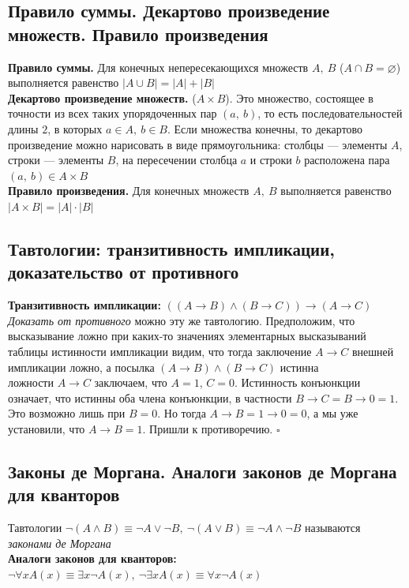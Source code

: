 \documentclass[a4paper]{article}
\newcommand{\qed}{\hfill$\square$}
\begin{document}
\subsection{Правило суммы. Декартово произведение множеств. Правило произведения}
\textbf{Правило суммы.} Для конечных непересекающихся множеств $A,\ B$ ($A\cap B=\varnothing$) выполняется равенство $|A\cup B|=|A|+|B|$\\[2mm]
\indent \textbf{Декартово произведение множеств.} ($A\times B$). Это множество, состоящее в точности из всех таких упорядоченных пар $(a,\ b)$, то есть последовательностей длины $2$, в которых $a\in A,\ b\in B$. Если множества конечны, то декартово произведение можно нарисовать в виде прямоугольника: столбцы — элементы $A$, строки — элементы $B$, на пересечении столбца $a$ и строки $b$ расположена пара $(a,\ b)\in A\times B$\\[2mm]
\indent \textbf{Правило произведения.} Для конечных множеств $A,\ B$ выполняется равенство $|A\times B|=|A|\cdot|B|$
\subsection{Тавтологии: транзитивность импликации, доказательство от противного}
\textbf{Транзитивность импликации:} $((A\rightarrow B)\wedge(B\rightarrow C))\rightarrow(A\rightarrow C)$\\[2mm]
\indent \textit{Доказать от противного} можно эту же тавтологию. Предположим, что высказывание ложно при каких-то значениях элементарных высказываний\\[2mm]
 таблицы истинности импликации видим, что тогда заключение $A\rightarrow C$ внешней импликации ложно, а посылка $(A\rightarrow B)\wedge(B\rightarrow C)$ истинна\\[2mm]
 ложности $A\rightarrow C$ заключаем, что $A=1$, $C=0$. Истинность конъюнкции означает, что истинны оба члена конъюнкции, в частности $B\rightarrow C=B\rightarrow0=1$. Это возможно лишь при $B=0$. Но тогда $A\rightarrow B=1\rightarrow0=0$, а мы уже установили, что $A\rightarrow B=1$. Пришли к противоречию. \qed\\[2mm]
\subsection{Законы де Моргана. Аналоги законов де Моргана для кванторов}
Тавтологии $\neg(A\wedge B)\equiv\neg A\vee\neg B,\ \neg(A\vee B)\equiv\neg A\wedge\neg B$ называются \textit{законами де Моргана}\\[2mm]
\indent \textbf{Аналоги законов для кванторов:} $\neg\forall xA(x)\equiv\exists x\neg A(x),\ \neg\exists xA(x)\equiv\forall x\neg A(x)$
\end{document}
